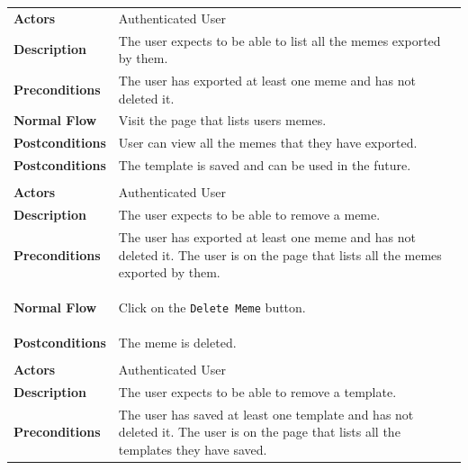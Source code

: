 \begin{longtable}{@{}>{\raggedright\arraybackslash}p{3cm} p{11cm}}
    \textbf{Actors}         & Authenticated User
    \\

    \textbf{Description}    & The user expects to be able to list all the memes exported by them.
    \\

    \textbf{Preconditions}  & The user has exported at least one meme and has not deleted it.
    \\

    \textbf{Normal Flow}    & Visit the page that lists users memes.
    \\

    \textbf{Postconditions} & User can view all the memes that they have exported.
    \\
    \textbf{Postconditions} & The template is saved and can be used in the future.
    \\

    \hline
    \multicolumn{2}{c}{\textbf{Remove a meme}}
    \\
    \hline

    \textbf{Actors}         &  Authenticated User
    \\

    \textbf{Description}    & The user expects to be able to remove a meme.
    \\

    \textbf{Preconditions}  & The user has exported at least one meme and has not deleted it. The user is on the page that lists all the memes exported by them.
    \\

    \textbf{Normal Flow}    & \begin{usecaseenum}
        \item Click on the \texttt{Delete Meme} button.
    \end{usecaseenum}
    \\

    \textbf{Postconditions} & The meme is deleted.
    \\
    \hline
    \multicolumn{2}{c}{\textbf{Remove a template}}
    \\
    \hline

    \textbf{Actors}         &  Authenticated User
    \\

    \textbf{Description}    & The user expects to be able to remove a template.
    \\

    \textbf{Preconditions}  & The user has saved at least one template and has not deleted it. The user is on the page that lists all the templates they have saved.
    \\


\end{longtable}
